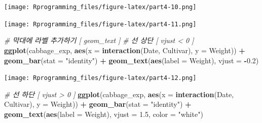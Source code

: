 \documentclass[10pt,]{krantz}
\makeatletter
\newenvironment{Shaded}{\begin{snugshade}}{\end{snugshade}}
\newcommand{\KeywordTok}[1]{\textcolor[rgb]{0.13,0.29,0.53}{\textbf{#1}}}
\newcommand{\DataTypeTok}[1]{\textcolor[rgb]{0.13,0.29,0.53}{#1}}
\newcommand{\DecValTok}[1]{\textcolor[rgb]{0.00,0.00,0.81}{#1}}
\newcommand{\FloatTok}[1]{\textcolor[rgb]{0.00,0.00,0.81}{#1}}
\newcommand{\StringTok}[1]{\textcolor[rgb]{0.31,0.60,0.02}{#1}}
\newcommand{\CommentTok}[1]{\textcolor[rgb]{0.56,0.35,0.01}{\textit{#1}}}
\newcommand{\OperatorTok}[1]{\textcolor[rgb]{0.81,0.36,0.00}{\textbf{#1}}}
\newcommand{\NormalTok}[1]{#1}
\newenvironment{kframe}{%
\medskip{}
\setlength{\fboxsep}{.8em}
 \def\at@end@of@kframe{}%
 \ifinner\ifhmode%
  \def\at@end@of@kframe{\end{minipage}}%
  \begin{minipage}{\columnwidth}%
 \fi\fi%
 \def\FrameCommand##1{\hskip\@totalleftmargin \hskip-\fboxsep
 \colorbox{shadecolor}{##1}\hskip-\fboxsep
     \hskip-\linewidth \hskip-\@totalleftmargin \hskip\columnwidth}%
 \MakeFramed {\advance\hsize-\width
   \@totalleftmargin\z@ \linewidth\hsize
   \@setminipage}}%
 {\par\unskip\endMakeFramed%
 \at@end@of@kframe}
\renewenvironment{Shaded}{\begin{kframe}}{\end{kframe}}
\theoremstyle{definition}
\theoremstyle{definition}
\theoremstyle{remark}
\makeatother
\begin{document}
\texttt{[image: Rprogramming\_files/figure-latex/part4-10.png]}

\begin{Shaded}
\end{Shaded}

\texttt{[image: Rprogramming\_files/figure-latex/part4-11.png]}

\begin{Shaded}
\begin{Highlighting}[]


\CommentTok{# 막대에 라벨 추가하기 [ geom_text ]}
\CommentTok{# 선 상단 [ vjust < 0 ]}
\KeywordTok{ggplot}\NormalTok{(cabbage_exp, }\KeywordTok{aes}\NormalTok{(}\DataTypeTok{x =} \KeywordTok{interaction}\NormalTok{(Date, Cultivar), }\DataTypeTok{y =}\NormalTok{ Weight)) }\OperatorTok{+}\StringTok{ }\KeywordTok{geom_bar}\NormalTok{(}\DataTypeTok{stat =} \StringTok{"identity"}\NormalTok{) }\OperatorTok{+}\StringTok{ }
\StringTok{  }\KeywordTok{geom_text}\NormalTok{(}\KeywordTok{aes}\NormalTok{(}\DataTypeTok{label =}\NormalTok{ Weight), }\DataTypeTok{vjust =} \OperatorTok{-}\FloatTok{0.2}\NormalTok{)}
\end{Highlighting}
\end{Shaded}

\texttt{[image: Rprogramming\_files/figure-latex/part4-12.png]}

\begin{Shaded}
\begin{Highlighting}[]


\CommentTok{# 선 하단 [ vjust > 0 ]}
\KeywordTok{ggplot}\NormalTok{(cabbage_exp, }\KeywordTok{aes}\NormalTok{(}\DataTypeTok{x =} \KeywordTok{interaction}\NormalTok{(Date, Cultivar), }\DataTypeTok{y =}\NormalTok{ Weight)) }\OperatorTok{+}\StringTok{ }\KeywordTok{geom_bar}\NormalTok{(}\DataTypeTok{stat =} \StringTok{"identity"}\NormalTok{) }\OperatorTok{+}\StringTok{ }
\StringTok{  }\KeywordTok{geom_text}\NormalTok{(}\KeywordTok{aes}\NormalTok{(}\DataTypeTok{label =}\NormalTok{ Weight), }\DataTypeTok{vjust =} \FloatTok{1.5}\NormalTok{, }\DataTypeTok{color =} \StringTok{"white"}\NormalTok{)}
\end{Highlighting}
\end{Shaded}
\end{document}
